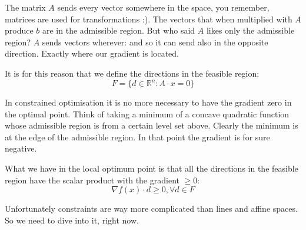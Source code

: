 \par The matrix $A$ sends every vector somewhere in the space, you remember, matrices are used for transformations :). The vectors that when multiplied with $A$ produce $b$ are in the admissible region. But who said $A$ likes only the admissible region? $A$ sends vectors wherever: and so it can send also in the opposite direction. Exactly where our gradient is located.
\par It is for this reason that we define the directions in the feasible region:
\begin{equation}
    F = \{d \in \mathbb{R}^n : A \cdot x = 0\}
\end{equation}
\par In constrained optimisation it is no more necessary to have the gradient zero in the optimal point. Think of taking a minimum of a concave quadratic function whose admissible region is from a certain level set above. Clearly the minimum is at the edge of the admissible region. In that point the gradient is for sure negative.
\par What we have in the local optimum point is that all the directions in the feasible region have the scalar product with the gradient $\geq 0$:
\begin{equation}
    \nabla f(x) \cdot d \geq 0, \forall d \in F
\end{equation}
\par Unfortunately constraints are way more complicated than lines and affine spaces. So we need to dive into it, right now.
%
